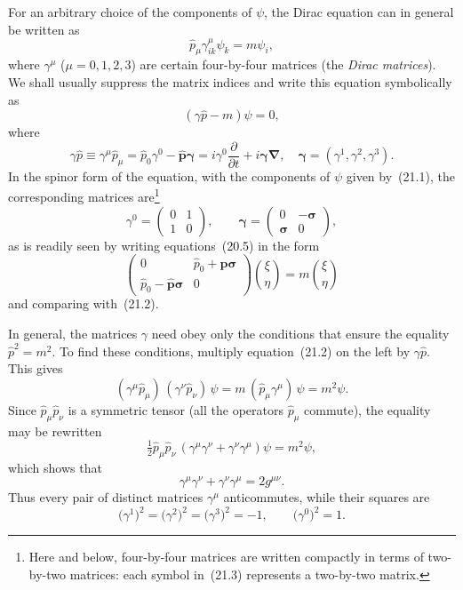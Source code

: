 For an arbitrary choice of the components of $\psi$, the Dirac equation can in general be written as
\[
\widehat p_\mu\gamma^{\mu}_{ik}\psi_k = m\psi_i,
\]
where $\gamma^\mu$ ($\mu = 0, 1, 2, 3$) are certain four-by-four matrices (the \emph{Dirac matrices}). We shall usually suppress the matrix indices and write this equation symbolically as
\begin{equation}
(\gamma\widehat p - m)\psi = 0,
\tag{21.2}
\end{equation}
where
\[
\gamma\widehat p \equiv \gamma^\mu\widehat p_\mu = \widehat p_0\gamma^0 - \widehat{\mathbf{p}}\boldsymbol{\gamma} = i\gamma^0\frac{\partial}{\partial t} + i\boldsymbol{\gamma}\boldsymbol{\nabla},\quad \boldsymbol{\gamma} = (\gamma^1, \gamma^2, \gamma^3).
\]
In the spinor form of the equation, with the components of $\psi$ given by~(21.1), the corresponding matrices are\footnote{Here and below, four-by-four matrices are written compactly in terms of two-by-two matrices: each symbol in~(21.3) represents a two-by-two matrix.}
\begin{equation}
\gamma^0 = \begin{pmatrix} 0 & 1\\ 1 & 0 \end{pmatrix},\qquad \boldsymbol{\gamma} = \begin{pmatrix} 0 & -\boldsymbol{\sigma}\\ \boldsymbol{\sigma} & 0 \end{pmatrix},
\tag{21.3}
\end{equation}
as is readily seen by writing equations~(20.5) in the form
\[
\begin{pmatrix} 0 & \widehat p_0 + \widehat{\mathbf{p}}\boldsymbol{\sigma}\\ \widehat p_0 - \widehat{\mathbf{p}}\boldsymbol{\sigma} & 0 \end{pmatrix}\binom{\xi}{\eta} = m\binom{\xi}{\eta}
\]
and comparing with~(21.2).

In general, the matrices $\gamma$ need obey only the conditions that ensure the equality $\widehat p^2 = m^2$. To find these conditions, multiply equation~(21.2) on the left by $\gamma\widehat p$. This gives
\[
(\gamma^\mu\widehat p_\mu)\,(\gamma^\nu\widehat p_\nu)\,\psi = m\,(\widehat p_\mu\gamma^\mu)\,\psi = m^2\psi.
\]
Since $\widehat p_\mu\widehat p_\nu$ is a symmetric tensor (all the operators $\widehat p_\mu$ commute), the equality may be rewritten
\[
\tfrac{1}{2}\widehat p_\mu\widehat p_\nu\,(\gamma^\mu\gamma^\nu + \gamma^\nu\gamma^\mu)\psi = m^2\psi,
\]
which shows that
\begin{equation}
\gamma^\mu\gamma^\nu + \gamma^\nu\gamma^\mu = 2g^{\mu\nu}.
\tag{21.4}
\end{equation}
Thus every pair of distinct matrices $\gamma^\mu$ anticommutes, while their squares are
\begin{equation}
\bigl(\gamma^1\bigr)^2 = \bigl(\gamma^2\bigr)^2 = \bigl(\gamma^3\bigr)^2 = -1,\qquad \bigl(\gamma^0\bigr)^2 = 1.
\tag{21.5}
\end{equation}

